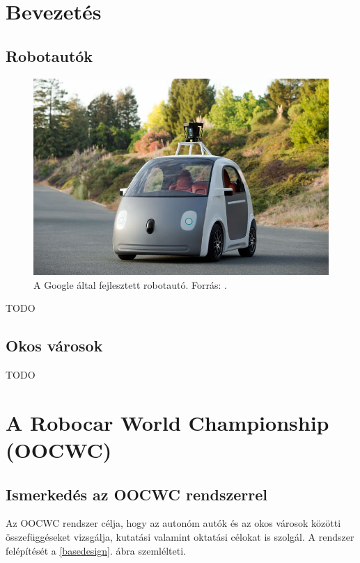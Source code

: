 \documentclass[a4paper,12pt]{report}
\begin{document}
\chapter{Bevezetés}

\section{Robotautók}
\label{robocars}

\begin{figure}[h]
\centerline{
\includegraphics[width=6in]{img/googleauto}}
\caption{A Google által fejlesztett robotautó. Forrás: \cite{googlecarimage}.}
\label{googleauto}
\end{figure}

TODO

\section{Okos városok}
\label{smartcities}

TODO


\chapter{A Robocar World Championship (OOCWC)}
\label{oocwc}

\section{Ismerkedés az OOCWC rendszerrel}

Az OOCWC rendszer célja, hogy az autonóm autók és az okos városok közötti összefüggéseket vizsgálja, kutatási valamint oktatási célokat is szolgál. A rendszer felépítését a \ref{basedesign}. ábra szemlélteti.
\end{document}
